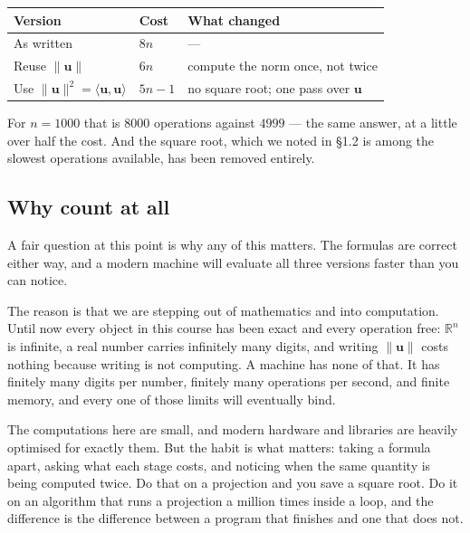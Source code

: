 \documentclass[11pt]{article}
\theoremstyle{plain}
\theoremstyle{definition}
\theoremstyle{remark}
\newcommand{\R}{\mathbb{R}}
\newcommand{\vc}[1]{\mathbf{#1}}
\newcommand{\norm}[1]{\lVert #1\rVert}
\begin{document}
\begin{center}
\renewcommand{\arraystretch}{1.35}
\begin{tabular}{@{}l l l@{}}
\toprule
\textbf{Version} & \textbf{Cost} & \textbf{What changed} \\
\midrule
As written                    & $8n$    & --- \\
Reuse $\norm{\vc{u}}$          & $6n$    & compute the norm once, not twice \\
Use $\norm{\vc{u}}^{2}=\langle\vc{u},\vc{u}\rangle$
                              & $5n-1$  & no square root; one pass over $\vc{u}$ \\
\bottomrule
\end{tabular}
\end{center}

\noindent For $n=1000$ that is $8000$ operations against $4999$ --- the same
answer, at a little over half the cost. And the square root, which we noted in
\S1.2 is among the slowest operations available, has been removed entirely.

\subsection{Why count at all}
A fair question at this point is why any of this matters. The formulas are
correct either way, and a modern machine will evaluate all three versions
faster than you can notice.

The reason is that we are stepping out of mathematics and into computation.
Until now every object in this course has been exact and every operation free:
$\R^{n}$ is infinite, a real number carries infinitely many digits, and writing
$\norm{\vc{u}}$ costs nothing because writing is not computing. A machine has
none of that. It has finitely many digits per number, finitely many operations
per second, and finite memory, and every one of those limits will eventually
bind.

The computations here are small, and modern hardware and libraries are heavily
optimised for exactly them. But the habit is what matters: taking a formula
apart, asking what each stage costs, and noticing when the same quantity is
being computed twice. Do that on a projection and you save a square root. Do it
on an algorithm that runs a projection a million times inside a loop, and the
difference is the difference between a program that finishes and one that does
not.
\end{document}
